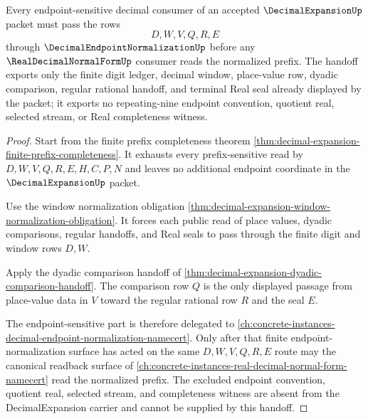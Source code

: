 \begin{theorem}
\label{thm:decimal-expansion-endpoint-normalization-handoff}
Every endpoint-sensitive decimal consumer of an accepted $\DecimalExpansionUp$ packet must pass the rows
$$
D,W,V,Q,R,E
$$
through $\DecimalEndpointNormalizationUp$ before any $\RealDecimalNormalFormUp$ consumer reads the normalized prefix. The handoff exports only the finite digit ledger, decimal window, place-value row, dyadic comparison, regular rational handoff, and terminal Real seal already displayed by the packet; it exports no repeating-nine endpoint convention, quotient real, selected stream, or Real completeness witness.
\end{theorem}
\begin{proof}
Start from the finite prefix completeness theorem \autoref{thm:decimal-expansion-finite-prefix-completeness}. It exhausts every prefix-sensitive read by $D,W,V,Q,R,E,H,C,P,N$ and leaves no additional endpoint coordinate in the $\DecimalExpansionUp$ packet.

Use the window normalization obligation \autoref{thm:decimal-expansion-window-normalization-obligation}. It forces each public read of place values, dyadic comparisons, regular handoffs, and Real seals to pass through the finite digit and window rows $D,W$.

Apply the dyadic comparison handoff of \autoref{thm:decimal-expansion-dyadic-comparison-handoff}. The comparison row $Q$ is the only displayed passage from place-value data in $V$ toward the regular rational row $R$ and the seal $E$.

The endpoint-sensitive part is therefore delegated to \autoref{ch:concrete-instances-decimal-endpoint-normalization-namecert}. Only after that finite endpoint-normalization surface has acted on the same $D,W,V,Q,R,E$ route may the canonical readback surface of \autoref{ch:concrete-instances-real-decimal-normal-form-namecert} read the normalized prefix. The excluded endpoint convention, quotient real, selected stream, and completeness witness are absent from the DecimalExpansion carrier and cannot be supplied by this handoff.
\end{proof}

